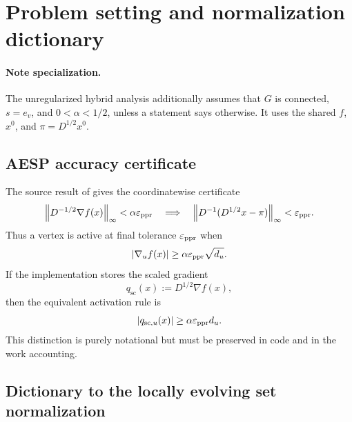 \section{Problem setting and normalization dictionary}
\label{sec:problem}



\paragraph{Note specialization.}
The unregularized hybrid analysis additionally assumes that \(G\) is
connected, \(s=e_v\), and \(0<\alpha<1/2\), unless a statement says
otherwise. It uses the shared \(f\), \(x^0\), and
\(\pi=D^{1/2}x^0\).

\subsection{AESP accuracy certificate}

The source result of \citet{huang2025accelerated} gives the coordinatewise
certificate
\begin{equation}
    \left\lVert D^{-1/2}\nabla f(x)\right\rVert_\infty<\alpha\varepsilon_{\mathrm{ppr}}
    \quad\Longrightarrow\quad
    \left\lVert D^{-1}(D^{1/2}x-\pi)\right\rVert_\infty<\varepsilon_{\mathrm{ppr}}.
    \label{eq:ppr-certificate}
\end{equation}
Thus a vertex is active at final tolerance \(\varepsilon_{\mathrm{ppr}}\) when
\begin{equation}
    \left\lvert \nabla_u f(x)\right\rvert\geq \alpha\varepsilon_{\mathrm{ppr}}\sqrt{d_u}.
    \label{eq:final-active-unscaled}
\end{equation}
If the implementation stores the scaled gradient
\begin{equation}
    q_{\mathrm{sc}}(x):=D^{1/2}\nabla f(x),
    \label{eq:q-scaled-gradient}
\end{equation}
then the equivalent activation rule is
\begin{equation}
    \left\lvert q_{\mathrm{sc},u}(x)\right\rvert\geq\alpha\varepsilon_{\mathrm{ppr}} d_u.
    \label{eq:final-active-scaled}
\end{equation}
This distinction is purely notational but must be preserved in code and in the
work accounting.

\subsection{Dictionary to the locally evolving set normalization}

